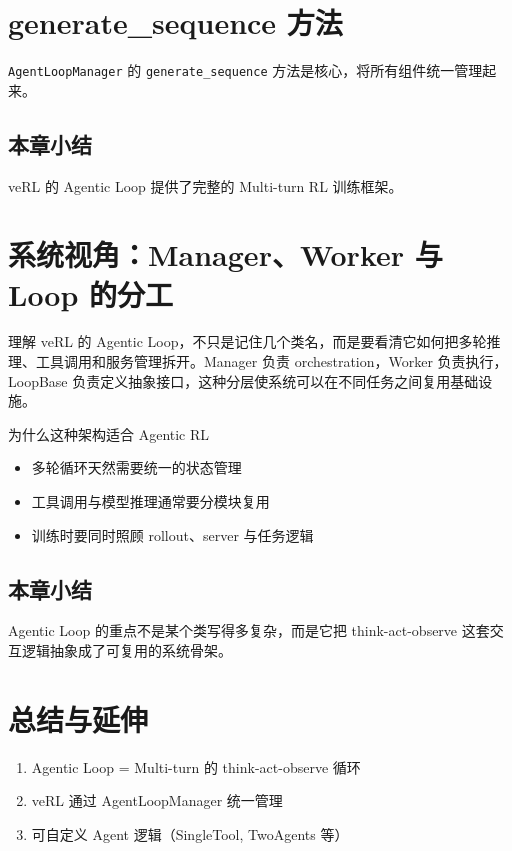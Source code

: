\documentclass[a4paper]{article}
\begin{document}
\section{generate\_sequence 方法}
\texttt{AgentLoopManager} 的 \texttt{generate\_sequence} 方法是核心，将所有组件统一管理起来。

\subsection{本章小结}
veRL 的 Agentic Loop 提供了完整的 Multi-turn RL 训练框架。

\section{系统视角：Manager、Worker 与 Loop 的分工}
理解 veRL 的 Agentic Loop，不只是记住几个类名，而是要看清它如何把多轮推理、工具调用和服务管理拆开。Manager 负责 orchestration，Worker 负责执行，LoopBase 负责定义抽象接口，这种分层使系统可以在不同任务之间复用基础设施。

\begin{knowledgebox}{为什么这种架构适合 Agentic RL}
\begin{itemize}
  \item 多轮循环天然需要统一的状态管理
  \item 工具调用与模型推理通常要分模块复用
  \item 训练时要同时照顾 rollout、server 与任务逻辑
\end{itemize}
\end{knowledgebox}

\subsection{本章小结}
Agentic Loop 的重点不是某个类写得多复杂，而是它把 think-act-observe 这套交互逻辑抽象成了可复用的系统骨架。

\newpage
\section{总结与延伸}
\begin{enumerate}
  \item Agentic Loop = Multi-turn 的 think-act-observe 循环
  \item veRL 通过 AgentLoopManager 统一管理
  \item 可自定义 Agent 逻辑（SingleTool, TwoAgents 等）
\end{enumerate}
\end{document}
